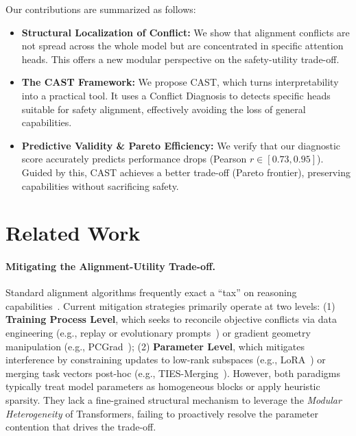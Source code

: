 \documentclass[11pt]{article}
\begin{document}
Our contributions are summarized as follows:
\begin{itemize}[leftmargin=*,itemsep=2pt, topsep=0pt, parsep=0pt]
    \item \textbf{Structural Localization of Conflict:} We show that alignment conflicts are not spread across the whole model but are concentrated in specific attention heads. This offers a new modular perspective on the safety-utility trade-off.
    
    \item \textbf{The CAST Framework:} We propose CAST, which turns interpretability into a practical tool. It uses a Conflict Diagnosis to detects specific heads suitable for safety alignment, effectively avoiding the loss of general capabilities.
    
    \item \textbf{Predictive Validity \& Pareto Efficiency:} We verify that our diagnostic score accurately predicts performance drops (Pearson $r \in [0.73, 0.95]$). Guided by this, CAST achieves a better trade-off (Pareto frontier), preserving capabilities without sacrificing safety.
\end{itemize}

\section{Related Work}

\paragraph{Mitigating the Alignment-Utility Trade-off.}
Standard alignment algorithms frequently exact a ``tax'' on reasoning capabilities~\cite{lin2024mitigatingalignmenttaxrlhf}. 
Current mitigation strategies primarily operate at two levels: 
(1) \textbf{Training Process Level}, which seeks to reconcile objective conflicts via data engineering (e.g., replay or evolutionary prompts~\cite{dong2024abilities,xu2025wizardlm}) or gradient geometry manipulation (e.g., PCGrad~\cite{yu2020gradient}); 
(2) \textbf{Parameter Level}, which mitigates interference by constraining updates to low-rank subspaces (e.g., LoRA~\cite{hu2021lora}) or merging task vectors post-hoc (e.g., TIES-Merging~\cite{yadav2023ties}). 
However, both paradigms typically treat model parameters as homogeneous blocks or apply heuristic sparsity. They lack a fine-grained structural mechanism to leverage the \textit{Modular Heterogeneity} of Transformers, failing to proactively resolve the parameter contention that drives the trade-off.
\end{document}
